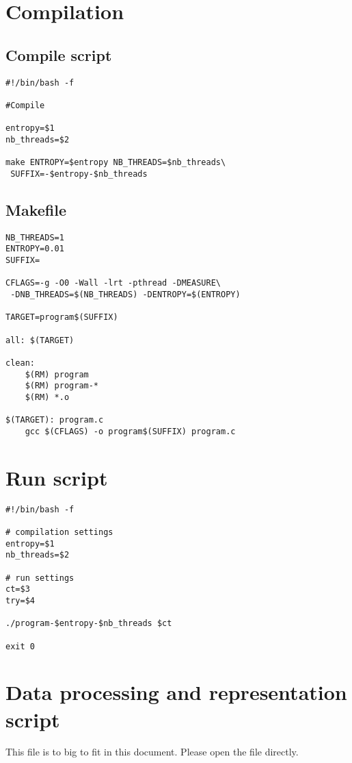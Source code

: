 \section{Compilation}
\label{app:compile}

\subsection{Compile script}
\begin{lstlisting}
#!/bin/bash -f

#Compile

entropy=$1
nb_threads=$2

make ENTROPY=$entropy NB_THREADS=$nb_threads\
 SUFFIX=-$entropy-$nb_threads
\end{lstlisting}

\subsection{Makefile}
\label{app:makefile}
\begin{lstlisting}
NB_THREADS=1
ENTROPY=0.01
SUFFIX=

CFLAGS=-g -O0 -Wall -lrt -pthread -DMEASURE\
 -DNB_THREADS=$(NB_THREADS) -DENTROPY=$(ENTROPY)

TARGET=program$(SUFFIX)

all: $(TARGET)

clean:
	$(RM) program
	$(RM) program-*
	$(RM) *.o
	
$(TARGET): program.c
	gcc $(CFLAGS) -o program$(SUFFIX) program.c
\end{lstlisting}

\section{Run script}
\label{app:run}
\begin{lstlisting}
#!/bin/bash -f

# compilation settings
entropy=$1
nb_threads=$2

# run settings
ct=$3
try=$4

./program-$entropy-$nb_threads $ct

exit 0
\end{lstlisting}

\section{Data processing and representation script}
\label{app:process}
This file is to big to fit in this document. Please open the file directly.

